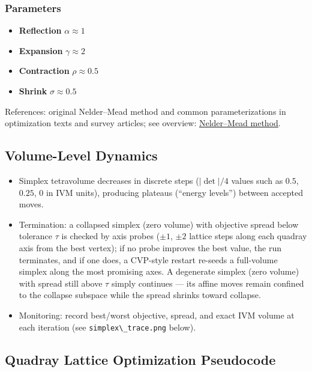 \documentclass[
  10pt,
]{article}
\newcommand{\passthrough}[1]{#1}
\providecommand{\tightlist}{%
  \setlength{\itemsep}{0pt}\setlength{\parskip}{0pt}}
\begin{document}
\subsubsection{Parameters}\label{parameters}

\begin{itemize}
\tightlist
\item
  \textbf{Reflection} \(\alpha \approx 1\)
\item
  \textbf{Expansion} \(\gamma \approx 2\)
\item
  \textbf{Contraction} \(\rho \approx 0.5\)
\item
  \textbf{Shrink} \(\sigma \approx 0.5\)
\end{itemize}

References: original Nelder--Mead method and common parameterizations in
optimization texts and survey articles; see overview:
\href{https://en.wikipedia.org/wiki/Nelder\%E2\%80\%93Mead_method}{Nelder--Mead
method}.

\subsection{Volume-Level Dynamics}\label{volume-level-dynamics}

\begin{itemize}
\tightlist
\item
  Simplex tetravolume decreases in discrete steps
  (\(\lvert\det\rvert/4\) values such as \(0.5\), \(0.25\), \(0\) in IVM
  units), producing plateaus (``energy levels'') between accepted moves.
\item
  Termination: a collapsed simplex (zero volume) with objective spread
  below tolerance \(\tau\) is checked by axis probes (\(\pm 1\),
  \(\pm 2\) lattice steps along each quadray axis from the best vertex);
  if no probe improves the best value, the run terminates, and if one
  does, a CVP-style restart re-seeds a full-volume simplex along the
  most promising axes. A degenerate simplex (zero volume) with spread
  still above \(\tau\) simply continues --- its affine moves remain
  confined to the collapse subspace while the spread shrinks toward
  collapse.
\item
  Monitoring: record best/worst objective, spread, and exact IVM volume
  at each iteration (see \passthrough{\lstinline!simplex\_trace.png!}
  below).
\end{itemize}

\subsection{Quadray Lattice Optimization
Pseudocode}\label{code:nelder_mead_on_integer_lattice}
\end{document}
